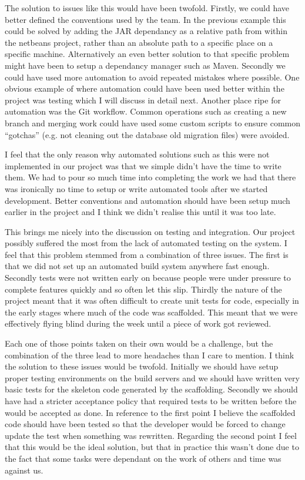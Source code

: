 \documentclass[paper=a4, fontsize=11pt]{scrartcl}	%
\numberwithin{equation}{section}															%
\numberwithin{figure}{section}																%
\numberwithin{table}{section}
\begin{document}
The solution to issues like this would have been twofold. Firstly, we could have better defined the conventions used by the team. In the previous example this could be solved by adding the JAR dependancy as a relative path from within the netbeans project, rather than an absolute path to a specific place on a specific machine. Alternatively an even better solution to that specific problem might have been to setup a dependancy manager such as Maven. Secondly we could have used more automation to avoid repeated mistakes where possible. One obvious example of where automation could have been used better within the project was testing which I will discuss in detail next. Another place ripe for automation was the Git workflow. Common operations such as creating a new branch and merging work could have used some custom scripts to ensure common ``gotchas'' (e.g. not cleaning out the database old migration files) were avoided.

I feel that the only reason why automated solutions such as this were not implemented in our project was that we simple didn't have the time to write them. We had to pour so much time into completing the work we had that there was ironically no time to setup or write automated tools after we started development. Better conventions and automation should have been setup much earlier in the project and I think we didn't realise this until it was too late.

This brings me nicely into the discussion on testing and integration. Our project possibly suffered the most from the lack of automated testing on the system. I feel that this problem stemmed from a combination of three issues. The first is that we did not set up an automated build system anywhere fast enough. Secondly tests were not written early on because people were under pressure to complete features quickly and so often let this slip. Thirdly the nature of the project meant that it was often difficult to create unit tests for code, especially in the early stages where much of the code was scaffolded. This meant that we were effectively flying blind during the week until a piece of work got reviewed.

Each one of those points taken on their own would be a challenge, but the combination of the three lead to more headaches than I care to mention. I think the solution to these issues would be twofold. Initially we should have setup proper testing environments on the build servers and we should have written very basic tests for the skeleton code generated by the scaffolding. Secondly we should have had a stricter acceptance policy that required tests to be written before the would be accepted as done. In reference to the first point I believe the scaffolded code should have been tested so that the developer would be forced to change update the test when something was rewritten. Regarding the second point I feel that this would be the ideal solution, but that in practice this wasn't done due to the fact that some tasks were dependant on the work of others and time was against us.
\end{document}
